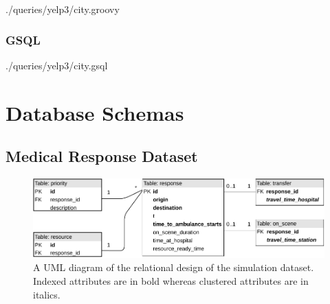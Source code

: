 
{./queries/yelp3/city.groovy}

\subsubsection{GSQL}



{./queries/yelp3/city.gsql}


\newpage
\onecolumn
\section{Database Schemas}
\label{app:schema}

\subsection{Medical Response Dataset}
\begin{figure}[htp]
    \centering
    \includegraphics[width=16cm]{img/schema/simRelational.pdf}
    \caption{A UML diagram of the relational design of the simulation dataset. Indexed attributes are in bold whereas clustered attributes are in italics.}
    \label{fig:simRelationalDesign}
\end{figure}

